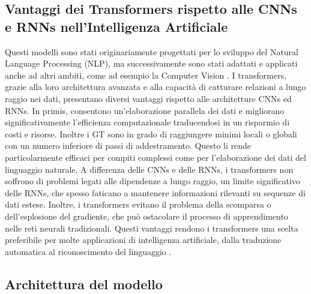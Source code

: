 \subsection{Vantaggi dei Transformers rispetto alle CNNs e RNNs nell'Intelligenza Artificiale}
Questi modelli sono stati originariamente progettati per lo sviluppo del Natural Language Processing (NLP), ma successivamente sono stati adattati e applicati anche ad altri ambiti, come ad esempio la Computer Vision \cite{han2022survey}.
I transformers, grazie alla loro architettura avanzata e alla capacità di catturare relazioni a lungo raggio nei dati, presentano diversi vantaggi rispetto alle architetture CNNs ed RNNs. In primis, consentono un'elaborazione parallela dei dati e migliorano significativamente l'efficienza computazionale traducendosi in un risparmio di costi e risorse. Inoltre i GT sono in grado di raggiungere minimi locali o globali con un numero inferiore di passi di addestramento. Questo li rende particolarmente efficaci per compiti complessi come per l'elaborazione dei dati del linguaggio naturale.
A differenza delle CNNs e delle RNNs, i transformers non soffrono di problemi legati alle dipendenze a lungo raggio, un limite significativo delle RNNs, che spesso faticano a mantenere informazioni rilevanti su sequenze di dati estese. Inoltre, i transformers evitano il problema della scomparsa o dell'esplosione del gradiente, che può ostacolare il processo di apprendimento nelle reti neurali tradizionali. Questi vantaggi rendono i transformers una scelta preferibile per molte applicazioni di intelligenza artificiale, dalla traduzione automatica al riconoscimento del linguaggio \cite{vaswani2017attention}.

\subsection{Architettura del modello}

